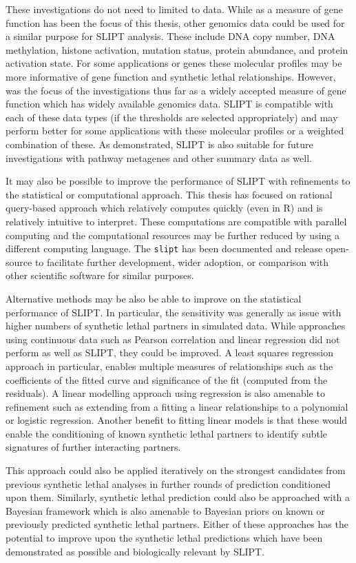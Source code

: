 These investigations do not need to limited to  data. While  as a measure of gene function has been the focus of this thesis, other \glspl{genomic} data could be used for a similar purpose for \gls{SLIPT} analysis. These include \acrshort{DNA} \gls{copy number}, \acrshort{DNA} methylation, histone activation, \gls{mutation} status, protein abundance, and protein activation state. For some applications or genes these molecular profiles may be more informative of gene function and \gls{synthetic lethal} relationships. However,  was the focus of the investigations thus far as a widely accepted measure of gene function which has widely available \glspl{genomic} data.  \gls{SLIPT} is compatible with each of these data types (if the thresholds are selected appropriately) and may perform better for some applications with these molecular profiles or a weighted combination of these. As demonstrated, \gls{SLIPT} is also suitable for future investigations with pathway \glspl{metagene} and other summary data as well.

It may also be possible to improve the performance of \gls{SLIPT} with refinements to the statistical or computational approach. This thesis has focused on rational query-based approach which relatively computes quickly (even in R) and is relatively intuitive to interpret. These computations are compatible with parallel computing and the computational resources may be further reduced by using a different computing language. The \texttt{slipt} has been documented and release open-source to facilitate further development, wider adoption, or comparison with other scientific software for similar purposes. 

Alternative methods may be also be able to improve on the statistical performance of \gls{SLIPT}. In particular, the sensitivity was generally as issue with higher numbers of \gls{synthetic lethal} partners in simulated data. While approaches using continuous data such as Pearson correlation and linear regression did not perform as well as \gls{SLIPT}, they could be improved. A least squares regression approach in particular, enables multiple measures of relationships such as the coefficients of the fitted curve and significance of the fit (computed from the residuals). A linear modelling approach using regression is also amenable to refinement such as extending from a fitting a linear relationships to a polynomial or logistic regression. Another benefit to fitting linear models is that these would enable the conditioning of known \gls{synthetic lethal} partners to identify subtle signatures of further interacting partners.

This approach could also be applied iteratively on the strongest candidates from previous \gls{synthetic lethal} analyses in further rounds of prediction conditioned upon them. Similarly, \gls{synthetic lethal} prediction could also be approached with a Bayesian framework which is also amenable to Bayesian priors on known or previously predicted \gls{synthetic lethal} partners. Either of these approaches has the potential to improve upon the \gls{synthetic lethal} predictions which have been demonstrated as possible and biologically relevant by \gls{SLIPT}. 